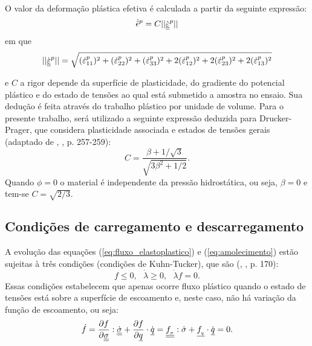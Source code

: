 O valor da deformação plástica efetiva é calculada a partir da seguinte expressão:
\begin{equation}
	\label{eq:epsPeq}
	\dot{{\bar \epsilon}}^p = C||\dot {\underline{\underline \varepsilon}}^p||
\end{equation}
em que
\begin{equation}
	\label{eq:epsPeq}
	||\dot {\underline{\underline \varepsilon}}^p|| = \sqrt{(\dot{\varepsilon}^{p}_{11})^2 + (\dot{\varepsilon}^{p}_{22})^2 + (\dot{\varepsilon}^{p}_{33})^2 + 2(\dot{\varepsilon}^{p}_{12})^2 + 2(\dot{\varepsilon}^{p}_{23})^2 + 2(\dot{\varepsilon}^{p}_{13})^2}
\end{equation}

e $C$ a rigor depende da superfície de plasticidade, do gradiente do potencial plástico e do estado de tensões ao qual está submetido a amostra no ensaio. Sua dedução é feita através do trabalho plástico por unidade de volume. Para o presente trabalho, será utilizado a seguinte expressão deduzida para Drucker-Prager, que considera plasticidade associada e estados de tensões gerais (adaptado de \citeauthor{Chen1988}, \citeyear{Chen1988}, p. 257-259):
\begin{equation}
	\label{eq:Czao}
	C = \dfrac{\beta+1/\sqrt{3}}{\sqrt{3\beta^2+1/2}}.
\end{equation}
Quando $\phi = 0$ o material é independente da pressão hidrostática, ou seja, $\beta = 0$ e tem-se $C = \sqrt{2/3}$.

\subsection{Condições de carregamento e descarregamento}

A evolução das equações (\ref{eq:fluxo_elastoplastico}) e (\ref{eq:amolecimento}) estão sujeitas à três condições (condições de Kuhn-Tucker), que são (\citeauthor{Neto2008}, \citeyear{Neto2008}, p. 170):
\begin{equation}
	\label{eq:kuhntucker}
	f \le 0,~~~ \dot \lambda \ge 0, ~~~ \dot \lambda f = 0.
\end{equation}
Essas condições estabelecem que apenas ocorre fluxo plástico quando o estado de tensões está sobre a superfície de escoamento e, neste caso, não há variação da função de escoamento, ou seja:
\begin{equation}
	\label{eq:consistencia}
	\dot f = \dfrac{\partial f}{\partial \underline{\underline \sigma}}:\dot {\underline{\underline \sigma}} + \dfrac{\partial f}{\partial \underline q}\cdot \dot {\underline q} = \underline{\underline {f_{_\sigma}}}:\dot \sigma + \underline{f_{_q}} \cdot \dot {\underline q} = 0.
\end{equation}


